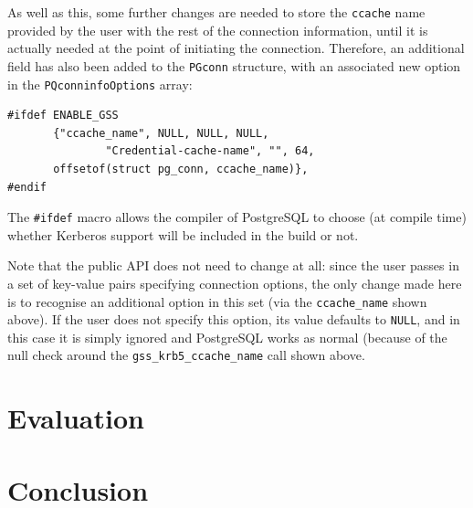 \documentclass{article}
\begin{document}
As well as this, some further changes are needed to store the \texttt{ccache} name provided by the user with the rest of the connection information, until it is actually needed at the point of initiating the connection. Therefore, an additional field has also been added to the \texttt{PGconn} structure, with an associated new option in the \texttt{PQconninfoOptions} array:

\begin{verbatim}
#ifdef ENABLE_GSS
       {"ccache_name", NULL, NULL, NULL,
               "Credential-cache-name", "", 64,
       offsetof(struct pg_conn, ccache_name)},
#endif
\end{verbatim}

The \verb+#ifdef+ macro allows the compiler of PostgreSQL to choose (at compile time) whether Kerberos support will be included in the build or not.

Note that the public API does not need to change at all: since the user passes in a set of key-value pairs specifying connection options, the only change made here is to recognise an additional option in this set (via the \verb+ccache_name+ shown above). If the user does not specify this option, its value defaults to \texttt{NULL}, and in this case it is simply ignored and PostgreSQL works as normal (because of the null check around the \verb+gss_krb5_ccache_name+ call shown above.


\section{Evaluation}

\section{Conclusion}
\end{document}
